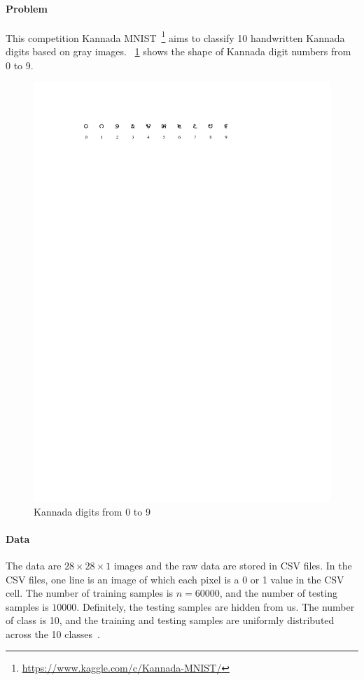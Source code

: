 \documentclass[]{article}
\begin{document}
\paragraph{Problem}
This competition Kannada MNIST~\footnote{\url{https://www.kaggle.com/c/Kannada-MNIST/}} aims to classify 10 handwritten Kannada digits based on gray images. \figurename{~\ref{fig:kdigit}} shows the shape of Kannada digit numbers from 0 to 9.
\begin{figure}[H]
    \centering
    \includegraphics[]{figs/kdigits}
    \caption{Kannada digits from 0 to 9}
    \label{fig:kdigit}
\end{figure}

\paragraph{Data}
The data are $28 \times 28 \times 1$ images and the raw data are stored in CSV files. In the CSV files, one line is an image of which each pixel is a 0 or 1 value in the CSV cell. The number of training samples is $n = 60000$, and the number of testing samples is $10000$. Definitely, the testing samples are hidden from us. The number of class is 10, and the training and testing samples are uniformly distributed across the 10 classes~\cite{prabhu2019kannada}.
\end{document}
